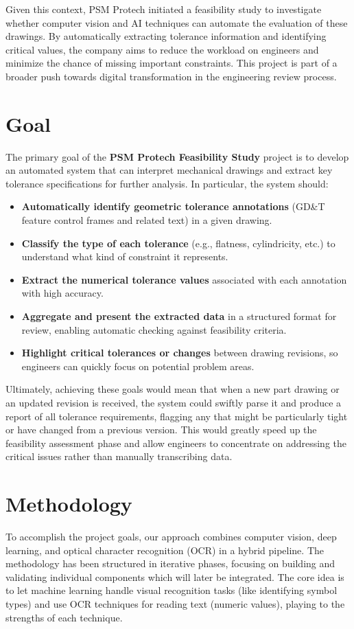 \documentclass[11pt,a4paper]{article}
\begin{document}
Given this context, PSM Protech initiated a feasibility study to investigate whether computer vision and AI techniques can automate the evaluation of these drawings. By automatically extracting tolerance information and identifying critical values, the company aims to reduce the workload on engineers and minimize the chance of missing important constraints. This project is part of a broader push towards digital transformation in the engineering review process.

\section{Goal}
The primary goal of the \textbf{PSM Protech Feasibility Study} project is to develop an automated system that can interpret mechanical drawings and extract key tolerance specifications for further analysis. In particular, the system should:
\begin{itemize}
  \item \textbf{Automatically identify geometric tolerance annotations} (GD\&T feature control frames and related text) in a given drawing.
  \item \textbf{Classify the type of each tolerance} (e.g., flatness, cylindricity, etc.) to understand what kind of constraint it represents.
  \item \textbf{Extract the numerical tolerance values} associated with each annotation with high accuracy.
  \item \textbf{Aggregate and present the extracted data} in a structured format for review, enabling automatic checking against feasibility criteria.
  \item \textbf{Highlight critical tolerances or changes} between drawing revisions, so engineers can quickly focus on potential problem areas.
\end{itemize}

Ultimately, achieving these goals would mean that when a new part drawing or an updated revision is received, the system could swiftly parse it and produce a report of all tolerance requirements, flagging any that might be particularly tight or have changed from a previous version. This would greatly speed up the feasibility assessment phase and allow engineers to concentrate on addressing the critical issues rather than manually transcribing data.

\section{Methodology}
To accomplish the project goals, our approach combines computer vision, deep learning, and optical character recognition (OCR) in a hybrid pipeline. The methodology has been structured in iterative phases, focusing on building and validating individual components which will later be integrated. The core idea is to let machine learning handle visual recognition tasks (like identifying symbol types) and use OCR techniques for reading text (numeric values), playing to the strengths of each technique. 
\end{document}
